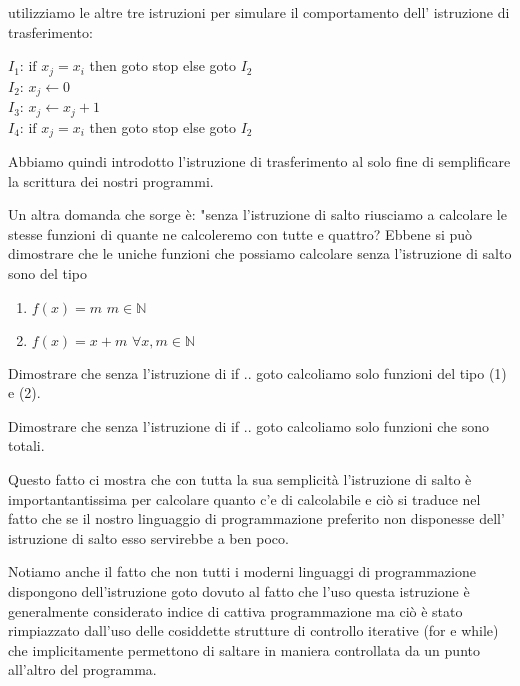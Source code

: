 \begin{esempio} utilizziamo le altre tre istruzioni per simulare il comportamento dell' istruzione di trasferimento:
\begin{mylisting}
$I_1$: $\textrm{if }x_j = x_i$ then goto stop else goto $I_2$\\
$I_2$: $x_j \leftarrow 0$\\
$I_3$: $x_j \leftarrow x_j +1$\\ 
$I_4$: $\textrm{if }x_j = x_i$ then goto stop else goto $I_2$\\
\end{mylisting}
\end{esempio}

Abbiamo quindi introdotto l'istruzione di trasferimento al solo fine di semplificare 
la scrittura dei nostri programmi.

Un altra domanda che sorge è: "senza l'istruzione di salto
riusciamo a calcolare le stesse funzioni di quante ne calcoleremo con tutte e quattro? Ebbene si può dimostrare che 
le uniche funzioni che possiamo calcolare senza l'istruzione di salto sono del tipo

\begin{enumerate}
\item $f(x) = m \, \, m \in  \mathbb{N} $ 
\item $f(x) = x+ m \, \,  \forall x ,  m \in  \mathbb{N} $ 
\end{enumerate}

\begin{extra}
Dimostrare che senza l'istruzione di if .. goto calcoliamo solo funzioni del tipo (1) e (2).
\end{extra}

\begin{extra}
Dimostrare che senza l'istruzione di if .. goto calcoliamo solo funzioni che sono totali.
\end{extra}

Questo fatto ci mostra che con tutta la sua semplicità l'istruzione di salto 
è importantantissima per calcolare quanto c'e di calcolabile e ciò si traduce nel fatto che
se il nostro linguaggio di programmazione preferito non disponesse dell' istruzione di salto 
esso servirebbe a ben poco.

Notiamo anche il fatto che non tutti i moderni linguaggi di programmazione 
dispongono dell'istruzione goto dovuto al fatto che l'uso questa istruzione 
è generalmente considerato indice di cattiva programmazione
ma ciò è stato rimpiazzato dall'uso delle cosiddette strutture di controllo iterative (for e while)
che implicitamente permettono di saltare in maniera controllata da un punto 
all'altro del programma.


